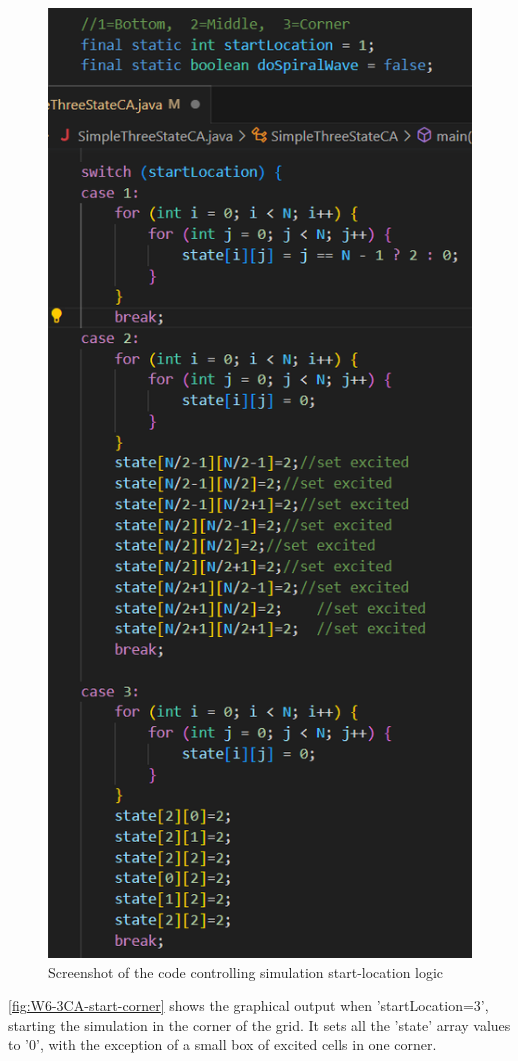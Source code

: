 \begin{figure}[H] 
    \centering
    \includegraphics[width=0.6\columnwidth]{Figures/Week 6/3stateCA-plane-logic-code.png}
    \caption{Screenshot of the code controlling simulation start-location logic}
    \label{fig:W6-3CA-conditional-logic-code}
\end{figure}

\newpage

\autoref{fig:W6-3CA-start-corner} shows the graphical output when 'startLocation=3', starting the simulation in the corner of the grid. It sets all the 'state' array values to '0', with the exception of a small box of excited cells in one corner.


